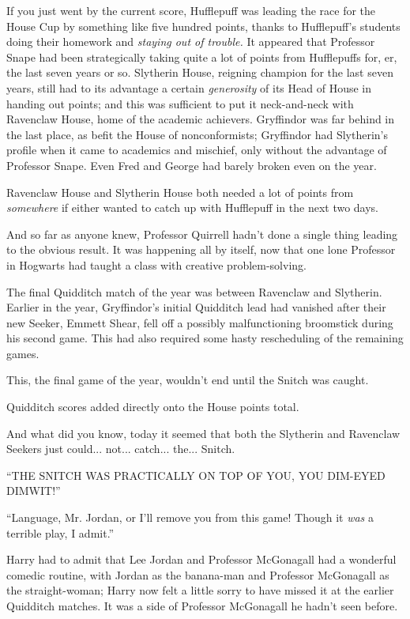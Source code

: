 If you just went by the current score, Hufflepuff was leading the race for the House Cup by something like five hundred points, thanks to Hufflepuff's students doing their homework and \emph{staying out of trouble.} It appeared that Professor Snape had been strategically taking quite a lot of points from Hufflepuffs for, er, the last seven years or so. Slytherin House, reigning champion for the last seven years, still had to its advantage a certain \emph{generosity} of its Head of House in handing out points; and this was sufficient to put it neck-and-neck with Ravenclaw House, home of the academic achievers. Gryffindor was far behind in the last place, as befit the House of nonconformists; Gryffindor had Slytherin's profile when it came to academics and mischief, only without the advantage of Professor Snape. Even Fred and George had barely broken even on the year.

Ravenclaw House and Slytherin House both needed a lot of points from \emph{somewhere} if either wanted to catch up with Hufflepuff in the next two days.

And so far as anyone knew, Professor Quirrell hadn't done a single thing leading to the obvious result. It was happening all by itself, now that one lone Professor in Hogwarts had taught a class with creative problem-solving.

The final Quidditch match of the year was between Ravenclaw and Slytherin. Earlier in the year, Gryffindor's initial Quidditch lead had vanished after their new Seeker, Emmett Shear, fell off a possibly malfunctioning broomstick during his second game. This had also required some hasty rescheduling of the remaining games.

This, the final game of the year, wouldn't end until the Snitch was caught.

Quidditch scores added directly onto the House points total.

And what did you know, today it seemed that both the Slytherin and Ravenclaw Seekers just could... not... catch... the... Snitch.

``THE SNITCH WAS PRACTICALLY ON TOP OF YOU, YOU DIM-EYED DIMWIT!''

``Language, Mr. Jordan, or I'll remove you from this game! Though it \emph{was} a terrible play, I admit.''

Harry had to admit that Lee Jordan and Professor McGonagall had a wonderful comedic routine, with Jordan as the banana-man and Professor McGonagall as the straight-woman; Harry now felt a little sorry to have missed it at the earlier Quidditch matches. It was a side of Professor McGonagall he hadn't seen before.

